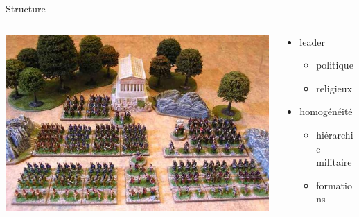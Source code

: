 \documentclass[utf8,hyperref={pagebackref}]{beamer}
\begin{document}
\begin{frame}{Structure}
\vspace{5mm}
\begin{columns}[c]
	\begin{column}[c]{0.48\linewidth}
		\begin{centering}
		\includegraphics[width=\linewidth]{../ressources/armee_cesar}
		\end{centering}
	\end{column}
	\begin{column}[c]{0.48\linewidth}
		\begin{itemize}
			\item leader
			\begin{itemize}
				\item politique
				\item religieux
			\end{itemize}
		\end{itemize}
		\begin{itemize}
			\item homogénéité
			\begin{itemize}
				\item hiérarchie militaire
				\item formations
			\end{itemize}
		\end{itemize}
	\end{column}
\end{columns}


\end{frame}
\end{document}
